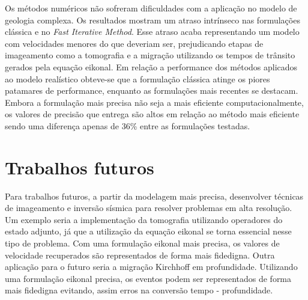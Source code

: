Os métodos numéricos não sofreram dificuldades com a aplicação no modelo de geologia complexa. Os resultados mostram um atraso intrínseco nas formulações clássica e no \textit{Fast Iterative Method}. Esse atraso acaba representando um modelo com velocidades menores do que deveriam ser, prejudicando etapas de imageamento como a tomografia e a migração utilizando os tempos de trânsito gerados pela equação eikonal. Em relação a performance dos métodos aplicados ao modelo realístico obteve-se que a formulação clássica atinge os piores patamares de performance, enquanto as formulações mais recentes se destacam. Embora a formulação mais precisa não seja a mais eficiente computacionalmente, os valores de precisão que entrega são altos em relação ao método mais eficiente sendo uma diferença apenas de 36\% entre as formulações testadas.


\section{Trabalhos futuros}

Para trabalhos futuros, a partir da modelagem mais precisa, desenvolver técnicas de imageamento e inversão sísmica para resolver problemas em alta resolução. Um exemplo seria a implementação da tomografia utilizando operadores do estado adjunto, já que a utilização da equação eikonal se torna essencial nesse tipo de problema. Com uma formulação eikonal mais precisa, os valores de velocidade recuperados são representados de forma mais fidedigna. Outra aplicação para o futuro seria a migração Kirchhoff em profundidade. Utilizando uma formulação eikonal precisa, os eventos podem ser representados de forma mais fidedigna evitando, assim erros na conversão tempo - profundidade. 
